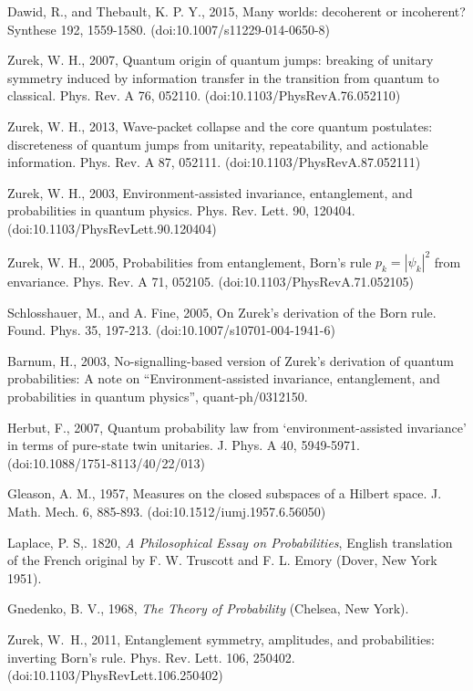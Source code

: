 \documentclass[aps,amsmath,amssymb,amsfonts,12pt]{revtex4-1}
\newcommand{\+}         {\dagger}
\begin{document}
{{{\begin{references}
 Dawid, R., and Thebault, K. P. Y., 2015, Many worlds: decoherent or incoherent? Synthese 192, 1559-1580. (doi:10.1007/s11229-014-0650-8)    

 Zurek, W. H., 2007, Quantum origin of quantum jumps: breaking of unitary symmetry induced
by information transfer in the transition from quantum to classical. Phys. Rev. A 76, 052110.
(doi:10.1103/PhysRevA.76.052110)

 Zurek, W. H., 2013,
Wave-packet collapse and the core quantum postulates: discreteness of
quantum jumps from unitarity, repeatability, and actionable information. Phys. Rev. A 87,
052111. (doi:10.1103/PhysRevA.87.052111)


 Zurek, W. H., 2003, Environment-assisted invariance, entanglement, and probabilities in
quantum physics. Phys. Rev. Lett. 90, 120404. (doi:10.1103/PhysRevLett.90.120404)

 Zurek, W. H., 2005, Probabilities from entanglement, Born's rule $p_k = |\psi_k|^2$ from envariance.
Phys. Rev. A 71, 052105. (doi:10.1103/PhysRevA.71.052105)

 Schlosshauer, M., and A. Fine,  2005,  On Zurek's derivation of the Born rule. Found. Phys. 35, 197-213.
(doi:10.1007/s10701-004-1941-6)

 Barnum, H., 2003, No-signalling-based version of Zurek's derivation
of quantum probabilities: A note on ``Environment-assisted invariance,
entanglement, and probabilities in quantum physics'', quant-ph/0312150.

 Herbut, F., 2007, Quantum probability law from `environment-assisted invariance' in terms of
pure-state twin unitaries. J. Phys. A 40, 5949-5971. (doi:10.1088/1751-8113/40/22/013)

 Gleason, A. M., 1957, Measures on the closed subspaces of a Hilbert space. J. Math. Mech. 6,
885-893. (doi:10.1512/iumj.1957.6.56050)

 Laplace, P. S,. 1820, {\it A Philosophical Essay on Probabilities}, English translation of
the French original by F. W. Truscott and F. L. Emory (Dover, New York 1951).

 Gnedenko,  B. V., 1968, {\it The Theory of Probability}
(Chelsea, New York).

 Zurek, W.~H., 2011, Entanglement symmetry, amplitudes, and probabilities: inverting Born's
rule. Phys. Rev. Lett. 106, 250402. (doi:10.1103/PhysRevLett.106.250402)


\end{references}}}}
\end{document}
